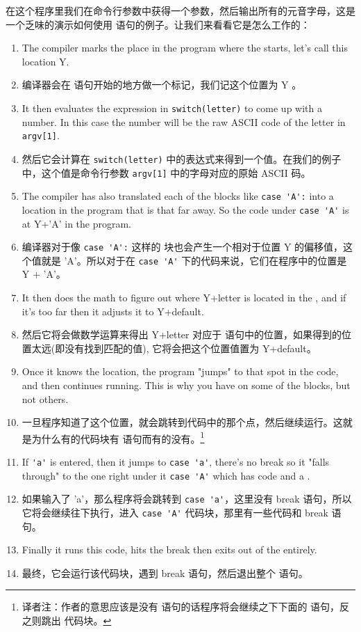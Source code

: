 在这个程序里我们在命令行参数中获得一个参数，然后输出所有的元音字母，这是一个乏味的演示如何使用  语句的例子。让我们来看看它是怎么工作的：
\begin{enumerate}
\item The compiler marks the place in the program where the
     starts, let's call this location Y.
\item 编译器会在  语句开始的地方做一个标记，我们记这个位置为 Y 。
\item It then evaluates the expression in \verb|switch(letter)| to
    come up with a number.  In this case the number will be the
    raw ASCII code of the letter in \verb|argv[1]|.
\item 然后它会计算在 \verb|switch(letter)| 中的表达式来得到一个值。在我们的例子中，这个值是命令行参数 \verb|argv[1]| 中的字母对应的原始 ASCII 码。
\item The compiler has also translated each of the  
    blocks like \verb|case 'A':| into a location in the program
    that is that far away.  So the code under \verb|case 'A'| is
    at Y+'A' in the program.
\item 编译器对于像 \verb|case 'A':| 这样的  块也会产生一个相对于位置 Y 的偏移值，这个值就是 'A'。所以对于在 \verb|case 'A'| 下的代码来说，它们在程序中的位置是 Y + 'A'。
\item It then does the math to figure out where Y+letter is
    located in the , and if it's too
    far then it adjusts it to Y+default.
\item 然后它将会做数学运算来得出 Y+letter 对应于  语句中的位置，如果得到的位置太远(即没有找到匹配的值), 它将会把这个位置值置为 Y+default。
\item Once it knows the location, the program "jumps" to that spot
    in the code, and then continues running.  This is why you have
     on some of the  blocks, but not others.
\item 一旦程序知道了这个位置，就会跳转到代码中的那个点，然后继续运行。这就是为什么有的代码块有  语句而有的没有。\footnote{译者注：作者的意思应该是没有  语句的话程序将会继续之下下面的  语句，反之则跳出  代码块。}
\item If \verb|'a'| is entered, then it jumps to \verb|case 'a'|, there's
    no break so it "falls through" to the one right under it \verb|case 'A'|
    which has code and a .
\item 如果输入了 'a'，那么程序将会跳转到 \verb|case 'a'|，这里没有 break 语句，所以它将会继续往下执行，进入 \verb|case 'A'| 代码块，那里有一些代码和 break 语句。
\item Finally it runs this code, hits the break then exits out of the
     entirely.
\item 最终，它会运行该代码块，遇到 break 语句，然后退出整个  语句。
\end{enumerate}

